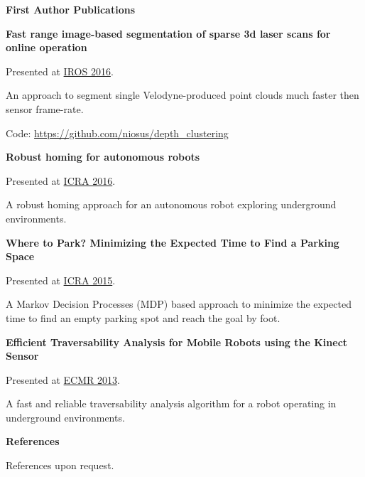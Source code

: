 \documentclass[a4paper,12pt,final]{memoir}
\newcommand{\SmallSep}{\vspace{0.5em}}
\newcommand{\CVSection}[1]
	{\Large\textbf{#1}\par
	\SmallSep\normalsize\normalfont}
\newcommand{\CVItem}[1]
	{\textbf{\color{MidnightBlue} #1}}
\begin{document}
\CVSection{First Author Publications}
\CVItem{Fast range image-based segmentation of sparse 3d laser scans for online operation}
\begin{compactitem}[\color{MidnightBlue}$\circ$]
	\item Presented at \href{http://iros2016.org/}{IROS 2016}.
	\item An approach to segment single Velodyne-produced point clouds much
	faster then sensor frame-rate.
	\item Code: \href{https://github.com/niosus/depth_clustering}{https://github.com/niosus/depth\_clustering}
\end{compactitem}
\CVItem{Robust homing for autonomous robots}
\begin{compactitem}[\color{MidnightBlue}$\circ$]
	\item Presented at \href{http://icra2016.org/}{ICRA 2016}.
	\item A robust homing approach for an autonomous robot exploring underground environments.
\end{compactitem}
\CVItem{Where to Park? Minimizing the Expected Time to Find a Parking Space}
\begin{compactitem}[\color{MidnightBlue}$\circ$]
	\item Presented at \href{http://icra2015.org/}{ICRA 2015}.
	\item A Markov Decision Processes (MDP) based approach to minimize the
	expected time to find an empty parking spot and reach the goal by foot.
\end{compactitem}
\CVItem{Efficient Traversability Analysis for Mobile Robots using the Kinect Sensor}
\begin{compactitem}[\color{MidnightBlue}$\circ$]
	\item Presented at \href{http://www.iri.upc.edu/ecmr13/#home}{ECMR 2013}.
	\item A fast and reliable traversability analysis algorithm for a robot
	operating in underground environments.
\end{compactitem}
\SmallSep

\vfill
\CVSection{References}
	References upon request.
\clearpage
\framebreak

\end{document}
